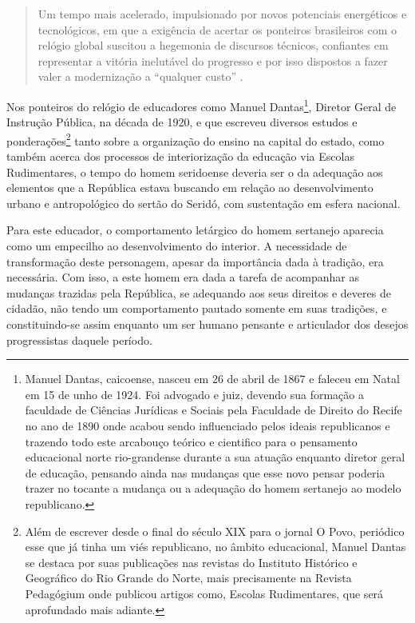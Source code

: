 \begin{refsection}
\begin{quotation}
    Um tempo mais acelerado, impulsionado por novos potenciais energéticos e tecnológicos, em que a exigência de acertar os ponteiros brasileiros com o relógio global suscitou a hegemonia de discursos técnicos, confiantes em representar a vitória inelutável do progresso e por isso dispostos a fazer valer a modernização a ``qualquer custo'' \cite[p.~27]{Sevcenko1998Preludio}.
\end{quotation}

Nos ponteiros do relógio de educadores como Manuel Dantas\footnote{Manuel Dantas, caicoense, nasceu em 26 de abril de 1867 e faleceu em Natal em 15 de unho de 1924. Foi advogado e juiz, devendo sua formação a faculdade de Ciências Jurídicas e Sociais pela Faculdade de Direito do Recife no ano de 1890 onde acabou sendo influenciado pelos ideais republicanos e trazendo todo este arcabouço teórico e cientifico para o pensamento educacional norte rio-grandense durante a sua atuação enquanto diretor geral de educação, pensando ainda nas mudanças que esse novo pensar poderia trazer no tocante a mudança ou a adequação do homem sertanejo ao modelo republicano.}, Diretor Geral de Instrução Pública, na década de 1920, e que escreveu diversos estudos e ponderações\footnote{Além de escrever desde o final do século XIX para o jornal O Povo, periódico esse que já tinha um viés republicano, no âmbito educacional, Manuel Dantas se destaca por suas publicações nas revistas do Instituto Histórico e Geográfico do Rio Grande do Norte, mais precisamente na Revista Pedagógium onde publicou artigos como, Escolas Rudimentares, que será aprofundado mais adiante.} tanto sobre a organização do ensino na capital do estado, como também acerca dos processos de interiorização da educação via Escolas Rudimentares, o tempo do homem seridoense deveria ser o da adequação aos elementos que a República estava buscando em relação ao desenvolvimento urbano e antropológico do sertão do Seridó, com sustentação em esfera nacional.  

Para este educador, o comportamento letárgico do homem sertanejo aparecia como um empecilho ao desenvolvimento do interior. A necessidade de transformação deste personagem, apesar da importância dada à tradição, era necessária. Com isso, a este homem era dada a tarefa de acompanhar as mudanças trazidas pela República, se adequando aos seus direitos e deveres de cidadão, não tendo um comportamento pautado somente em suas tradições, e constituindo-se assim enquanto um ser humano pensante e articulador dos desejos progressistas daquele período.  


\end{refsection}
